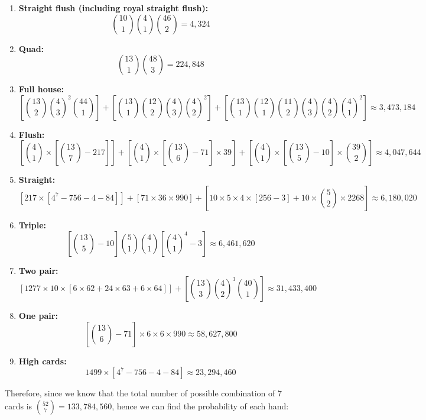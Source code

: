 \documentclass{article}
\begin{document}
\begin{enumerate}
    \item \textbf{Straight flush (including royal straight flush):}
    \[
        \binom{10}{1} \binom{4}{1} \binom{46}{2} 
        = 4,324
    \]
    \item \textbf{Quad:} 
    \[
        \binom{13}{1} \binom{48}{3} 
        = 224,848
    \]
    \item \textbf{Full house:}
    \[
        \left[ \binom{13}{2} \binom{4}{3}^2 \binom{44}{1} \right]
        + \left[ \binom{13}{1} \binom{12}{2} \binom{4}{3} \binom{4}{2}^2 \right]
        + \left[ \binom{13}{1} \binom{12}{1} \binom{11}{2} \binom{4}{3} \binom{4}{2} \binom{4}{1}^2 \right]
        \approx 3,473,184
    \]
    \item \textbf{Flush:}
    \[
        \left[ \binom{4}{1} \times \left[ \binom{13}{7} - 217 \right] \right]
        + \left[ \binom{4}{1} \times \left[ \binom{13}{6} - 71 \right] \times 39 \right]
        + \left[ \binom{4}{1} \times \left[ \binom{13}{5} - 10 \right] \times \binom{39}{2} \right]
        \approx 4,047,644
    \]
    \item \textbf{Straight:}
    \[
        [217 \times [4^7 - 756 - 4 - 84]] 
        + [71 \times 36 \times 990] 
        + \left[ 10 \times 5 \times 4 \times [256 - 3] + 10 \times \binom{5}{2} \times 2268 \right]
        \approx 6,180,020
    \]
    \item \textbf{Triple:}
    \[
        \left[ \binom{13}{5} - 10 \right] \binom{5}{1} \binom{4}{1} \left[ \binom{4}{1}^4 - 3 \right]
        \approx 6,461,620
    \]
    \item \textbf{Two pair:}
    \[
        [1277 \times 10 \times [6 \times 62 + 24 \times 63 + 6 \times 64]]
        + \left[ \binom{13}{3} \binom{4}{2}^3 \binom{40}{1} \right]
        \approx 31,433,400
    \]
    \item \textbf{One pair:}
    \[
        \left[ \binom{13}{6} - 71 \right] \times 6 \times 6 \times 990
        \approx 58,627,800
    \]
    \item \textbf{High cards:}
    \[
        1499 \times [ 4^7 - 756 - 4 - 84 ]
        \approx 23,294,460
    \]
\end{enumerate}
Therefore, since we know that the total number of possible combination 
of 7 cards is $\displaystyle \binom{52}{7} = 133,784,560$, hence we can 
find the probability of each hand:
\end{document}
